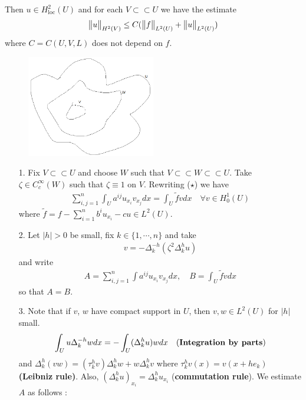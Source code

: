 \documentclass[12pt,a4paper]{report}
\newenvironment{proof}
{\begin{changemargin}{1cm}{0.5cm} 
	}%
	{\end{changemargin}
}
\begin{document}
\quad Then $u\in H_{\text{loc}}^2(U)$ and for each $V \subset\subset U$ we have the estimate
\begin{align*}
\bigl\lVert u\bigr\rVert_{H^2(V)} \leq C( \bigl\lVert f\bigr\rVert_{L^2(U)} + \bigl\lVert u\bigr\rVert_{L^2(U)}) 
\end{align*}
where $C = C(U,V,L)$ does not depend on $f$.
\begin{proof}
\pf 
\begin{figure}[h]
	\centering
	\includegraphics[width=0.5\textwidth]{7}
\end{figure}
\begin{itemize}
\item[1.] Fix $V \subset \subset U$ and choose $W$ such that $V \subset\subset W \subset\subset U$. Take $\zeta \in C_c^{\infty}(W)$ such that $\zeta \equiv 1$ on $V$. Rewriting ($\star$) we have
\begin{align*}
\sum_{i,j=1}^n \int_U a^{ij} u_{x_i} v_{x_j} dx = \int_U \tilde{f} v dx \quad \forall v \in H_0^1 (U)
\end{align*} 
where $\tilde{f} = f-\sum_{i=1}^n b^i u_{x_i} -cu \in L^2(U)$.
\item[2.] Let $|h| >0$ be small, fix $k\in \{1,\cdots, n\}$ and take
\begin{align*}
v = -\Delta_k^{-h} (\zeta^2 \Delta_k^h u)
\end{align*}
and write
\begin{align*}
A = \sum_{i,j=1}^n \int a^{ij} u_{x_i} v_{x_j} dx, \quad B = \int_U \tilde{f} v dx
\end{align*}
so that $A=B$.
\item[3.] Note that if $v$, $w$ have compact support in $U$, then $v,w\in L^2(U)$ for $|h|$ small.
\begin{align*}
\int_U u \Delta^{-h}_k wdx = -\int_U (\Delta_k^h u) w dx \quad \text{(\textbf{Integration by parts})}
\end{align*}
and $\Delta_k^h (vw) = (\tau^h_k v)\Delta_k^h w + w\Delta_k^h v$ where $\tau_k^h v(x) = v(x+he_k)$ \textbf{(Leibniz rule)}. Also, $(\Delta_k^h u)_{x_i} = \Delta_k^h u_{x_i}$ (\textbf{commutation rule}). We estimate $A$ as follows :

\end{itemize}
\end{proof}
\end{document}
